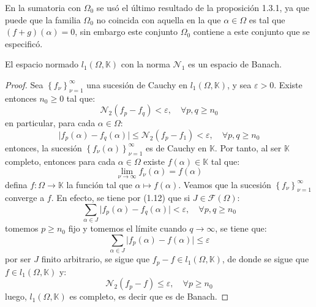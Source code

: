 \documentclass[12pt]{report}
\theoremstyle{largebreak}
\newcommand\cf[3]{\ensuremath{#1:#2\rightarrow#3}}
\newcommand\abs[1]{\ensuremath{\big|#1\big|}}
\begin{document}
    \begin{obs}
        En la sumatoria con $\Omega_0$ se usó el último resultado de la proposición 1.3.1, ya que puede que la familia $\Omega_0$ no coincida con aquella en la que $\alpha\in\Omega$ es tal que $(f+g)(\alpha)=0$, sin embargo este conjunto $\Omega_0$ contiene a este conjunto que se especificó.
    \end{obs}

    \begin{theor}
        El espacio normado $l_1(\Omega,\mathbb{K})$ con la norma $\mathcal{N}_1$ es un espacio de Banach.
    \end{theor}

    \begin{proof}
        Sea $\left\{f_\nu \right\}_{\nu=1}^\infty$ una sucesión de Cauchy en $l_1(\Omega,\mathbb{K})$, y sea $\varepsilon>0$. Existe entonces $n_0\geq 0$ tal que:
        \begin{equation}
            \mathcal{N}_2(f_p-f_q)<\varepsilon,\quad\forall p,q\geq n_0
        \end{equation}
        en particular, para cada $\alpha\in\Omega$:
        \begin{equation*}
            \abs{f_p(\alpha)-f_q(\alpha)}\leq\mathcal{N}_2(f_p-f_1)<\varepsilon,\quad\forall p,q\geq n_0
        \end{equation*}
        entonces, la sucesión $\left\{f_\nu(\alpha) \right\}_{\nu=1}^\infty$ es de Cauchy en $\mathbb{K}$. Por tanto, al ser $\mathbb{K}$ completo, entonces para cada $\alpha\in\Omega$ existe $f(\alpha)\in\mathbb{K}$ tal que:
        \begin{equation*}
            \lim_{\nu\rightarrow\infty}f_\nu(\alpha)=f(\alpha)
        \end{equation*}
        defina $\cf{f}{\Omega}{\mathbb{K}}$ la función tal que $\alpha\mapsto f(\alpha)$. Veamos que la sucesión $\left\{f_\nu \right\}_{\nu=1}^\infty$ converge a $f$. En efecto, se tiene por (1.12) que si $J\in\mathcal{F}(\Omega)$:
        \begin{equation*}
            \sum_{ \alpha\in J}\abs{f_p(\alpha)-f_q(\alpha)}<\varepsilon,\quad\forall p,q\geq n_0
        \end{equation*}
        tomemos $p\geq n_0$ fijo y tomemos el límite cuando $q\rightarrow\infty$, se tiene que:
        \begin{equation*}
            \sum_{ \alpha\in J}\abs{f_p(\alpha)-f(\alpha)}\leq\varepsilon
        \end{equation*}
        por ser $J$ finito arbitrario, se sigue que $f_p-f\in l_1(\Omega,\mathbb{K})$, de donde se sigue que $f\in l_1(\Omega,\mathbb{K})$ y:
        \begin{equation*}
            \mathcal{N}_2(f_p-f)\leq\varepsilon,\quad\forall p\geq n_0
        \end{equation*}
        luego, $l_1(\Omega,\mathbb{K})$ es completo, es decir que es de Banach.
    \end{proof}
\end{document}
